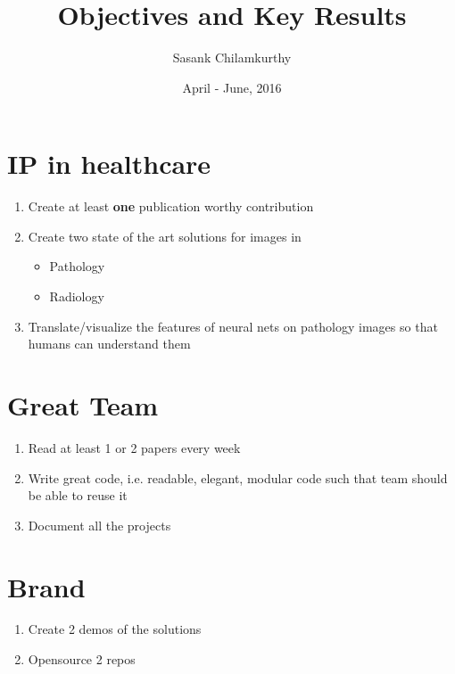 \documentclass[a4paper]{article}
\begin{document}
\title{Objectives and Key Results}
\author{Sasank Chilamkurthy}
\date{April - June, 2016}
\maketitle


\section{IP in healthcare}
\begin{enumerate}
	\item Create at least \textbf{one} publication worthy contribution
	\item Create two state of the art solutions for images in 
		\begin{itemize}
			\item Pathology
			\item Radiology
		\end{itemize}
	\item Translate/visualize the features of neural nets on pathology images so that humans can understand them
\end{enumerate}

\section{Great Team}
\begin{enumerate}
	\item Read at least 1 or 2 papers every week
	\item Write great code, i.e. readable, elegant, modular code such that team should be able to reuse it
	\item Document all the projects
\end{enumerate}

\section{Brand}
\begin{enumerate}
	\item Create 2 demos of the solutions
	\item Opensource 2 repos
\end{enumerate}
\end{document}
